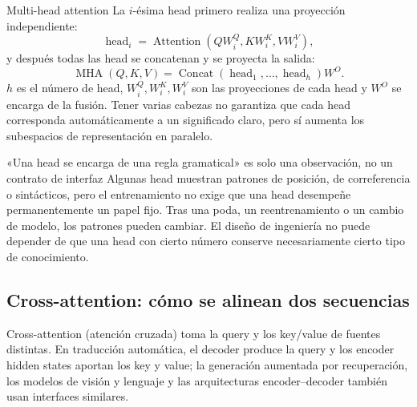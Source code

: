 
\begin{importantbox}{Multi-head attention}
La $i$-ésima head primero realiza una proyección independiente:
\[
\operatorname{head}_i=\operatorname{Attention}(QW_i^Q,KW_i^K,VW_i^V),
\]
y después todas las head se concatenan y se proyecta la salida:
\[
\operatorname{MHA}(Q,K,V)=\operatorname{Concat}(\operatorname{head}_1,\ldots,\operatorname{head}_h)W^O.
\]
$h$ es el número de head, $W_i^Q,W_i^K,W_i^V$ son las proyecciones de cada head y $W^O$ se encarga de la fusión. Tener varias cabezas no garantiza que cada head corresponda automáticamente a un significado claro, pero sí aumenta los subespacios de representación en paralelo.
\end{importantbox}


\begin{warningbox}{«Una head se encarga de una regla gramatical» es solo una observación, no un contrato de interfaz}
Algunas head muestran patrones de posición, de correferencia o sintácticos, pero el entrenamiento no exige que una head desempeñe permanentemente un papel fijo. Tras una poda, un reentrenamiento o un cambio de modelo, los patrones pueden cambiar. El diseño de ingeniería no puede depender de que una head con cierto número conserve necesariamente cierto tipo de conocimiento.
\end{warningbox}

\subsection{Cross-attention: cómo se alinean dos secuencias}

Cross-attention (atención cruzada) toma la query y los key/value de fuentes distintas. En traducción automática, el decoder produce la query y los encoder hidden states aportan los key y value; la generación aumentada por recuperación, los modelos de visión y lenguaje y las arquitecturas encoder--decoder también usan interfaces similares.


